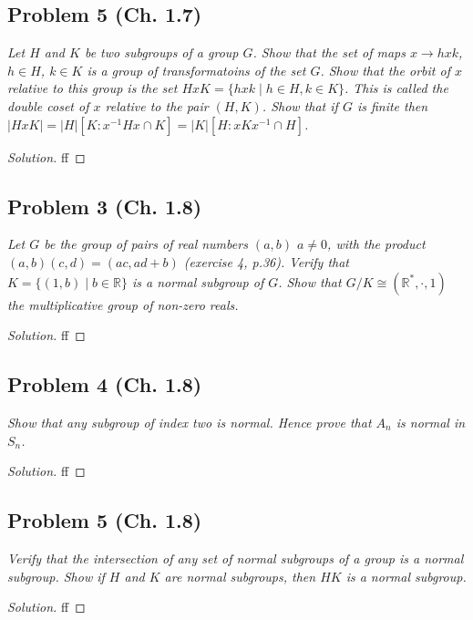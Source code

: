 \documentclass{article}
\newcommand{\R}{{\mathbb R}}
\begin{document}
\subsection*{Problem 5 (Ch. 1.7)}
{\it Let $H$ and $K$ be two subgroups of a group $G$.
Show that the set of maps $x \to hxk$, $h \in H$, $k \in K$
is a group of transformatoins of the set $G$.
Show that the orbit of $x$ relative to this group
is the set $HxK = \{hxk \mid h\in H, k\in K\}$.
This is called the \emph{double coset of $x$ relative to the pair $(H,K)$}.
Show that if $G$ is finite then $|HxK| = |H|[K \colon x^{-1}Hx\cap K]
= |K|[H\colon xKx^{-1} \cap H]$.}
\begin{proof}[Solution]\let\qed\relax
	ff
\end{proof}

\subsection*{Problem 3 (Ch. 1.8)}
{\it Let $G$ be the group of pairs of real numbers $(a,b)$ $a\neq0$,
with the product $(a,b)(c,d) = (ac,ad+b)$ (exercise 4, p.36).
Verify that $K = \{(1,b)\mid b\in\R\}$ is a normal subgroup of $G$.
Show that $G/K \cong (\R^*,\cdot,1)$ the multiplicative group of non-zero reals.}
\begin{proof}[Solution]\let\qed\relax
	ff
\end{proof}

\subsection*{Problem 4 (Ch. 1.8)}
{\it Show that any subgroup of index two is normal.
Hence prove that $A_n$ is normal in $S_n$.}
\begin{proof}[Solution]\let\qed\relax
	ff
\end{proof}

\subsection*{Problem 5 (Ch. 1.8)}
{\it Verify that the intersection of any set of normal subgroups
of a group is a normal subgroup.
Show if $H$ and $K$ are normal subgroups,
then $HK$ is a normal subgroup.}
\begin{proof}[Solution]\let\qed\relax
	ff
\end{proof}
\end{document}
